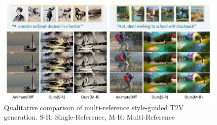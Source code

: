 \begin{figure}[!h]
    \centering
    \includegraphics[width=0.87\linewidth]{figures/comp_video2.pdf}
    \vspace{-1em}
    \caption{Qualitative comparison of multi-reference style-guided T2V generation. S-R: Single-Reference, M-R: Multi-Reference
    } 
    \vspace{-1em}
    \label{fig:result_multi_ref}
\end{figure}



\begin{table}[!t]
\centering
\caption{Quantitative comparison of style-guided T2V generation. Top 3 rows: single-reference based gudiance. Bottom 3 rows: multi-reference based guidance. S-R: Single-Refernce, M-R: Multi-Reference, W.E.: Warping Errors.}
\label{tab:video_quan_clip}
\vspace{-1em}
\end{table}

